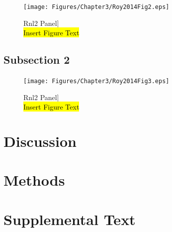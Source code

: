 \begin{figure}[htbp]
	\centering 
	\texttt{[image: Figures/Chapter3/Roy2014Fig2.eps]}
	\caption[SeqZip Diagram]
	{
		Rnl2 Panel]\\
		\hl{Insert Figure Text}
	}
	\label{fig:Roy2014 Rnl2}
\end{figure}


\subsection{Subsection 2}

\begin{figure}[htbp]
	\centering 
	\texttt{[image: Figures/Chapter3/Roy2014Fig3.eps]}
	\caption[SeqZip Diagram]
	{
		Rnl2 Panel]\\
		\hl{Insert Figure Text}
	}
	\label{fig:Roy2014 Rnl2}
\end{figure}

\section{Discussion}\label{c1sec: Discussion}
\section{Methods}\label{c1sec: Methods}

\section{Supplemental Text}\label{c1sec: Supplemental Text}

